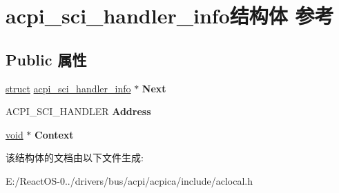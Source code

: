 \hypertarget{structacpi__sci__handler__info}{}\section{acpi\+\_\+sci\+\_\+handler\+\_\+info结构体 参考}
\label{structacpi__sci__handler__info}
\subsection*{Public 属性}
\begin{DoxyCompactItemize}
\item 
\mbox{\label{structacpi__sci__handler__info_a531bf43d900e4615a5800e7fdc965866}} 
\hyperlink{interfacestruct}{struct} \hyperlink{structacpi__sci__handler__info}{acpi\+\_\+sci\+\_\+handler\+\_\+info} $\ast$ {\bfseries Next}
\item 
\mbox{\label{structacpi__sci__handler__info_aab76e313b8f7809c7936dfad489c0d66}} 
A\+C\+P\+I\+\_\+\+S\+C\+I\+\_\+\+H\+A\+N\+D\+L\+ER {\bfseries Address}
\item 
\mbox{\label{structacpi__sci__handler__info_aa053b7e85edd1967246b83c5ed035af6}} 
\hyperlink{interfacevoid}{void} $\ast$ {\bfseries Context}
\end{DoxyCompactItemize}


该结构体的文档由以下文件生成\+:\begin{DoxyCompactItemize}
\item 
E\+:/\+React\+O\+S-\/0../drivers/bus/acpi/acpica/include/aclocal.\+h\end{DoxyCompactItemize}
